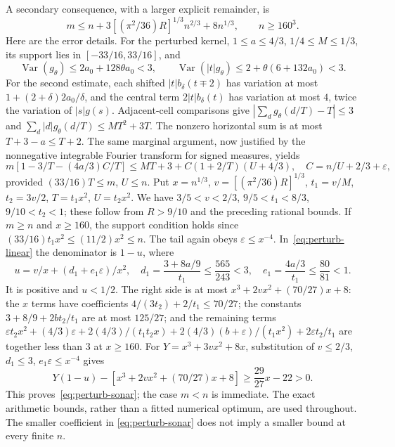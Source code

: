 \documentclass[10pt]{article}
\numberwithin{equation}{section}
\theoremstyle{remark}
\begin{document}
A secondary consequence, with a larger explicit remainder, is
\begin{equation}\label{eq:perturb-sonar}
 m\le n+3[(\pi^2/36)R]^{1/3}n^{2/3}+8n^{1/3},\qquad n\ge160^3.
\end{equation}
Here are the error details. For the perturbed kernel,
$1\le a\le4/3$, $1/4\le M\le1/3$, its support lies in $[-33/16,33/16]$,
and
\[
 \operatorname{Var}(g_\theta)\le2a_0+128\theta a_0<3,\qquad
 \operatorname{Var}(|t|g_\theta)\le2+\theta(6+132a_0)<3.
\]
For the second estimate, each shifted $|t|b_\delta(t\mp2)$ has
variation at most $1+(2+\delta)2a_0/\delta$, and the central term
$2|t|b_\delta(t)$ has variation at most $4$, twice the variation of
$|s|g(s)$.
Adjacent-cell comparisons give
$|\sum_d g_\theta(d/T)-T|\le3$ and
$\sum_d|d|g_\theta(d/T)\le MT^2+3T$.
The nonzero horizontal sum is at most $T+3-a\le T+2$.
The same marginal argument, now justified by the nonnegative integrable
Fourier transform for signed measures, yields
\begin{equation}\label{eq:perturb-linear}
 m[1-3/T-(4a/3)C/T]\le MT+3+C(1+2/T)(U+4/3),
 \quad C=n/U+2/3+\varepsilon,
\end{equation}
provided $(33/16)T\le m$, $U\le n$.
Put $x=n^{1/3}$, $v=[(\pi^2/36)R]^{1/3}$,
$t_1=v/M$, $t_2=3v/2$, $T=t_1x^2$, $U=t_2x^2$.
We have $3/5<v<2/3$, $9/5<t_1<8/3$, $9/10<t_2<1$;
these follow from $R>9/10$ and the preceding rational bounds.
If $m\ge n$ and $x\ge160$, the support condition holds since
$(33/16)t_1x^2\le(11/2)x^2\le n$. The tail again obeys
$\varepsilon\le x^{-4}$.
In~\eqref{eq:perturb-linear} the denominator is $1-u$, where
\[
 u=v/x+(d_1+e_1\varepsilon)/x^2,\quad
 d_1=\frac{3+8a/9}{t_1}\le\frac{565}{243}<3,\quad
 e_1=\frac{4a/3}{t_1}\le\frac{80}{81}<1.
\]
It is positive and $u<1/2$. The right side is at most
$x^3+2vx^2+(70/27)x+8$: the $x$ terms have coefficients
$4/(3t_2)+2/t_1\le70/27$;
the constants $3+8/9+2bt_2/t_1$ are at most $125/27$;
and the remaining terms
$\varepsilon t_2x^2+(4/3)\varepsilon
+2(4/3)/(t_1t_2x)+2(4/3)(b+\varepsilon)/(t_1x^2)
+2\varepsilon t_2/t_1$
are together less than $3$ at $x\ge160$.
For $Y=x^3+3vx^2+8x$, substitution of
$v\le2/3$, $d_1\le3$, $e_1\varepsilon\le x^{-4}$ gives
\[
 Y(1-u)-[x^3+2vx^2+(70/27)x+8]\ge\frac{29}{27}x-22>0.
\]
This proves~\eqref{eq:perturb-sonar}; the case $m<n$ is immediate.
The exact arithmetic bounds, rather than a fitted numerical optimum,
are used throughout. The smaller coefficient in
\eqref{eq:perturb-sonar} does not imply a smaller bound at every finite $n$.
\end{document}
